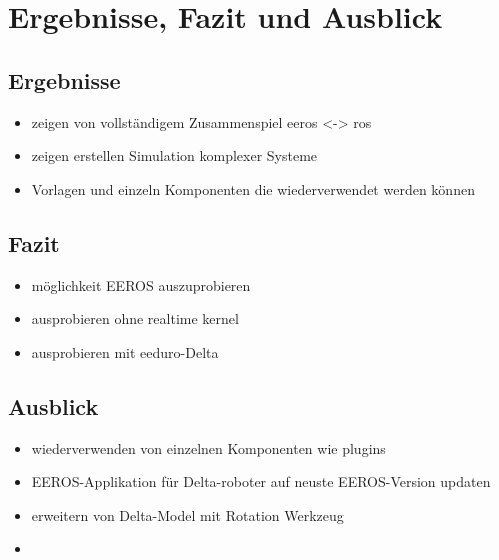 \chapter{Ergebnisse, Fazit und Ausblick}

\section{Ergebnisse}
\begin{itemize}
\item zeigen von vollständigem Zusammenspiel eeros <-> ros
\item zeigen erstellen Simulation komplexer Systeme
\item Vorlagen und einzeln Komponenten die wiederverwendet werden können
\end{itemize}

\section{Fazit}
\begin{itemize}
\item möglichkeit EEROS auszuprobieren
\item ausprobieren ohne realtime kernel
\item ausprobieren mit eeduro-Delta
\end{itemize}

\section{Ausblick}
\begin{itemize}
\item wiederverwenden von einzelnen Komponenten wie plugins
\item EEROS-Applikation für Delta-roboter auf neuste EEROS-Version updaten
\item erweitern von Delta-Model mit Rotation Werkzeug
\item 
\end{itemize}